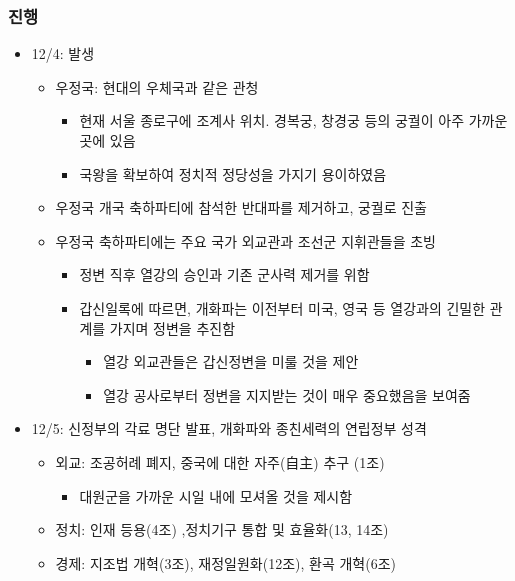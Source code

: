 \subsubsection*{진행}
\begin{itemize}
    \item 12/4: 발생
    \begin{itemize}
        \item 우정국: 현대의 우체국과 같은 관청
        \begin{itemize}
            \item 현재 서울 종로구에 조계사 위치. 경복궁, 창경궁 등의 궁궐이 아주 가까운 곳에 있음
            \item 국왕을 확보하여 정치적 정당성을 가지기 용이하였음
        \end{itemize}
        \item 우정국 개국 축하파티에 참석한 반대파를 제거하고, 궁궐로 진출
        \item 우정국 축하파티에는 주요 국가 외교관과 조선군 지휘관들을 초빙
        \begin{itemize}
            \item 정변 직후 열강의 승인과 기존 군사력 제거를 위함
            \item 갑신일록에 따르면, 개화파는 이전부터 미국, 영국 등 열강과의 긴밀한 관계를 가지며 정변을 추진함
            \begin{itemize}
                \item 열강 외교관들은 갑신정변을 미룰 것을 제안
                \item 열강 공사로부터 정변을 지지받는 것이 매우 중요했음을 보여줌
            \end{itemize}
        \end{itemize}
    \end{itemize}
    \item 12/5: 신정부의 각료 명단 발표, 개화파와 종친세력의 연립정부 성격
    \begin{itemize}
        \item 외교: 조공허례 폐지, 중국에 대한 자주(自主) 추구 (1조)
        \begin{itemize}
            \item 대원군을 가까운 시일 내에 모셔올 것을 제시함
        \end{itemize}
        \item 정치: 인재 등용(4조) ,정치기구 통합 및 효율화(13, 14조)
        \item 경제: 지조법 개혁(3조), 재정일원화(12조), 환곡 개혁(6조)
        \begin{itemize}

\end{itemize}
\end{itemize}
\end{itemize}

